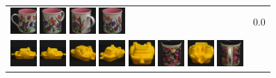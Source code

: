 \begin{figure}[tbp]
\begin{center}
\begin{tabular}{m{11cm} | m{3cm} |}
\includegraphics[width=1cm]{coil/beeld-7.eps} 
\includegraphics[width=1cm]{coil/beeld-9.eps} 
\includegraphics[width=1cm]{coil/beeld-10.eps} 
\includegraphics[width=1cm]{coil/beeld-8.eps} & {\scriptsize 0.0} \\ 
\includegraphics[width=1cm]{coil/beeld-12.eps} 
\includegraphics[width=1cm]{coil/beeld-13.eps} 
\includegraphics[width=1cm]{coil/beeld-16.eps} 
\includegraphics[width=1cm]{coil/beeld-15.eps} 
\includegraphics[width=1cm]{coil/beeld-14.eps} 
\includegraphics[width=1cm]{coil/beeld-62.eps} 
\includegraphics[width=1cm]{coil/beeld-17.eps} 
\includegraphics[width=1cm]{coil/beeld-65.eps} 

\end{tabular}
\end{center}
\end{figure}
